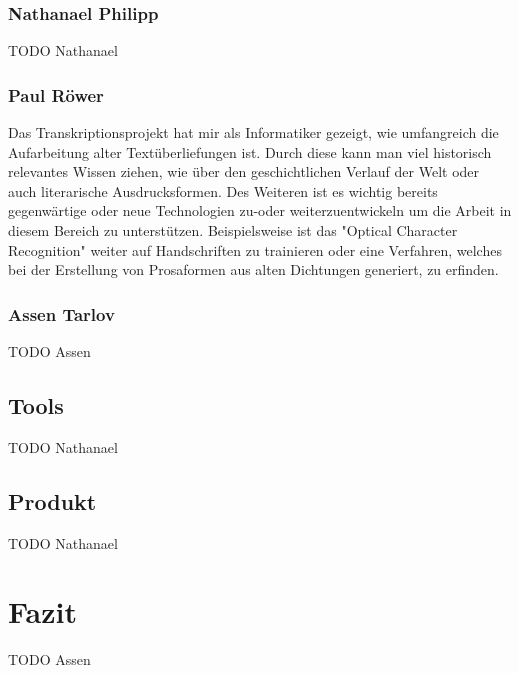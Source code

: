 \documentclass[a4paper, 12pt, oneside]{scrbook}
\begin{document}
\subsection{Nathanael Philipp}
TODO Nathanael
\subsection{Paul Röwer}
Das Transkriptionsprojekt hat mir als Informatiker gezeigt, wie umfangreich die Aufarbeitung alter Textüberliefungen ist. Durch diese kann man viel historisch relevantes Wissen ziehen, wie über den geschichtlichen Verlauf der Welt oder auch literarische Ausdrucksformen. Des Weiteren ist es wichtig bereits gegenwärtige oder neue Technologien  zu-oder weiterzuentwickeln um die Arbeit in diesem Bereich zu unterstützen. Beispielsweise ist das "Optical Character Recognition" weiter auf Handschriften zu trainieren oder eine Verfahren, welches bei der Erstellung von Prosaformen aus alten Dichtungen generiert, zu erfinden.
\subsection{Assen Tarlov}
TODO Assen
\section{Tools}
TODO Nathanael
\section{Produkt}
TODO Nathanael

\chapter{Fazit}
TODO Assen

\printbibliography
\end{document}
